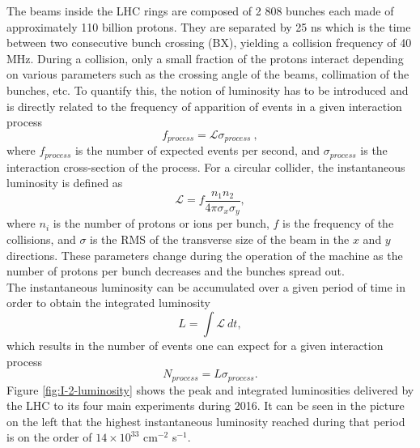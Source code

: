  	The beams inside the LHC rings are composed of 2 808 bunches each made of approximately 110 billion protons. They are separated by 25 ns which is the time between two consecutive bunch crossing (BX), yielding a collision frequency of 40 MHz. During a collision, only a small fraction of the protons interact depending on various parameters such as the crossing angle of the beams, collimation of the bunches, etc. To quantify this, the notion of luminosity has to be introduced and is directly related to the frequency of apparition of events in a given interaction process
  	\begin{equation}
  		f_{process} = \mathcal{L} \sigma_{process} \ ,
  	\end{equation}
  	where $ f_{process} $ is the number of expected events per second, and $ \sigma_{process} $ is the interaction cross-section of the process. For a circular collider, the instantaneous luminosity is defined as
  	\begin{equation}
  		\mathcal{L} = f \frac{n_1 n_2}{4 \pi \sigma_x \sigma_y},
  	\end{equation}
  	where $ n_i $ is the number of protons or ions per bunch, $ f $ is the frequency of the collisions, and $ \sigma $ is the RMS of the transverse size of the beam in the $x$ and $y$ directions. These parameters change during the operation of the machine as the number of protons per bunch decreases and the bunches spread out. \\

    The instantaneous luminosity can be accumulated over a given period of time in order to obtain the integrated luminosity
  	\begin{equation}
  		L = \int \mathcal{L} \ dt ,
  	\end{equation}
  	which results in the number of events one can expect for a given interaction process
  	\begin{equation}
  		N_{process} = L \sigma_{process} .
  	\end{equation}
    Figure \ref{fig:I-2-luminosity} shows the peak and integrated luminosities delivered by the LHC to its four main experiments during 2016. It can be seen in the picture on the left that the highest instantaneous luminosity reached during that period is on the order of $ 14 \times 10^{33} $ cm$^{-2}$ s$^{-1}$.

